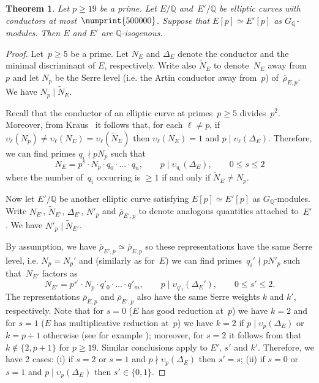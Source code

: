 \documentclass[12pt, reqno]{amsart}
\newcommand{\Q}{\mathbb{Q}}
\newcommand{\rhobar}{{\overline{\rho}}}
\newcommand{\vv}{\upsilon}
\numberwithin{equation}{section}
\newtheorem{theorem}{Theorem}[section]
\theoremstyle{definition}
\theoremstyle{remark}
\begin{document}
\begin{theorem}
 \label{T:cong19}
 Let $p \geq 19$ be a prime. Let $E/\Q$ and~$E'/\Q$ be elliptic curves
 with conductors at most~$\numprint{500000}$.  Suppose that $E[p]
 \simeq E'[p]$ as $G_\Q$-modules. Then $E$ and $E'$ are
 $\Q$-isogenous.
 \end{theorem}
\begin{proof} Let~$p \geq 5$ be a prime. Let $N_E$ and $\Delta_E$ 
denote the conductor and the minimal discriminant of $E$, respectively. Write also $\tilde{N}_E$ to denote~$N_E$ away from~$p$ and let $N_p$ be the Serre level (i.e. the Artin conductor away from~$p$) of~$\rhobar_{E,p}$. 
We have $N_p \mid \tilde{N}_E$.

Recall that the conductor of an elliptic curve at primes~$p \geq 5$ divides~$p^2$. Moreover, from Kraus~\cite[p. 30]{KrausThesis}
it follows that, for each $\ell \neq p$, if 
$\vv_{\ell}(N_p) \neq \vv_{\ell}(N_E) = \vv_{\ell}(\tilde{N}_E)$ then
$\vv_{\ell}(N_E) = 1$ and $p \mid \vv_{\ell}(\Delta_E)$.
Therefore, we can find primes $q_i \nmid pN_p$ such that 
\begin{equation}\label{E:condE}
  N_E = p^s \cdot N_p \cdot q_0 \cdot \ldots \cdot q_n, 
 \qquad p \mid \vv_{q_i}(\Delta_E), \qquad 0 \leq s \leq 2
\end{equation}
where the number of~$q_i$ occurring is $\geq 1$ if and only if 
$\tilde{N}_E \neq N_p$. 

Now let $E'/\Q$ be another elliptic curve satisfying $E[p] \simeq E'[p]$ as $G_\Q$-modules. Write $N_{E'}$, $\tilde{N}_{E'}$, $\Delta_{E'}$, $N'_p$ and $\rhobar_{E',p}$ to denote analogous quantities attached to~$E'$. We have $N'_p \mid \tilde{N}_{E'}$.

By assumption, we have $\rhobar_{E',p} \simeq \rhobar_{E,p}$ so these representations have the same Serre level, i.e. $N_p = N_p'$ and (similarly as for~$E$) we can find primes~$q_i' \nmid pN'_p$ such that~$N_{E'}$ factors as
\begin{equation}\label{E:condE'}
 N_{E'} = p^{s'} \cdot N_p \cdot q'_0 \cdot \ldots \cdot q'_m, 
 \qquad p \mid \vv_{q'_i}(\Delta_E'),
 \qquad 0 \leq s' \leq 2.
\end{equation}
The representations $\rhobar_{E,p}$ and $\rhobar_{E',p}$ also have the same Serre weights $k$ and $k'$, respectively. Note that for $s=0$ ($E$ has good reduction at~$p$) we have $k=2$ and for $s=1$ ($E$ has multiplicative reduction at~$p$) we have $k=2$ if $p \mid \vv_p(\Delta_E)$ or $k=p+1$ otherwise (see for example \cite[p. 3]{KrausThesis}); moreover, for $s=2$ it follows from \cite[Th\'eor\`eme 1]{KrausThesis} that $k \not\in \{2, p+1\}$ 
for $p \geq 19$. Similar conclusions apply to $E'$, $s'$ and $k'$. 
Therefore, we have 2 cases: (i) if $s = 2$ or $s=1$ and $p \nmid \vv_{p}(\Delta_E)$ then $s'=s$; (ii) if $s=0$ or $s=1$ and $p \mid \vv_{p}(\Delta_E)$ then $s' \in \{0,1 \}$.


\end{proof}
\end{document}
